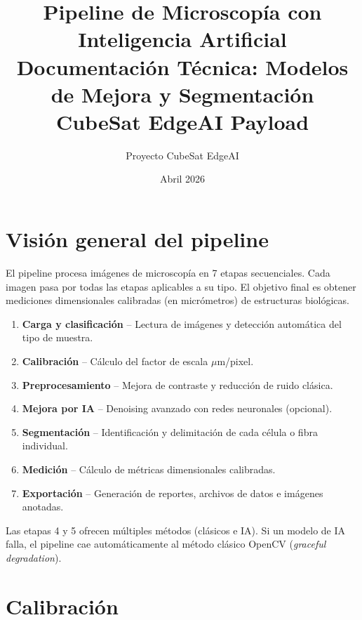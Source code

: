\documentclass[11pt,a4paper]{article}
\title{%
  \textbf{Pipeline de Microscop\'{i}a con Inteligencia Artificial} \\[0.5em]
  \large Documentaci\'{o}n T\'{e}cnica: Modelos de Mejora y Segmentaci\'{o}n \\[0.3em]
  \large CubeSat EdgeAI Payload
}
\author{Proyecto CubeSat EdgeAI}
\date{Abril 2026}
\begin{document}
\maketitle
\tableofcontents
\newpage

\section{Visi\'{o}n general del pipeline}

El pipeline procesa im\'{a}genes de microscop\'{i}a en 7 etapas secuenciales. Cada imagen pasa por todas las etapas aplicables a su tipo. El objetivo final es obtener mediciones dimensionales calibradas (en micr\'{o}metros) de estructuras biol\'{o}gicas.

\begin{enumerate}[leftmargin=2em]
  \item \textbf{Carga y clasificaci\'{o}n} -- Lectura de im\'{a}genes y detecci\'{o}n autom\'{a}tica del tipo de muestra.
  \item \textbf{Calibraci\'{o}n} -- C\'{a}lculo del factor de escala $\mu$m/pixel.
  \item \textbf{Preprocesamiento} -- Mejora de contraste y reducci\'{o}n de ruido cl\'{a}sica.
  \item \textbf{Mejora por IA} -- Denoising avanzado con redes neuronales (opcional).
  \item \textbf{Segmentaci\'{o}n} -- Identificaci\'{o}n y delimitaci\'{o}n de cada c\'{e}lula o fibra individual.
  \item \textbf{Medici\'{o}n} -- C\'{a}lculo de m\'{e}tricas dimensionales calibradas.
  \item \textbf{Exportaci\'{o}n} -- Generaci\'{o}n de reportes, archivos de datos e im\'{a}genes anotadas.
\end{enumerate}

Las etapas 4 y 5 ofrecen m\'{u}ltiples m\'{e}todos (cl\'{a}sicos e IA). Si un modelo de IA falla, el pipeline cae autom\'{a}ticamente al m\'{e}todo cl\'{a}sico OpenCV (\textit{graceful degradation}).

\section{Calibraci\'{o}n}
\end{document}
